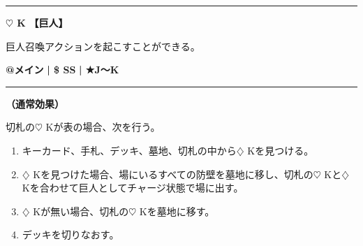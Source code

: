 \documentclass[twocolumn,a5paper,papersize,10pt]{jarticle}
\begin{document}
\vspace{-1zh}

 
 
 
 

\vspace{3mm} %
\hrule height 0.5mm depth 0mm width 66.5mm %
\vspace{1mm} %
{\Large\bf $\heartsuit$ K} {\normalsize\bf【巨人】} %
\vspace{1mm} %

巨人召喚アクションを起こすことができる。

\begin{tcolorbox}[title={\small\bf【Action】巨人召喚}{\scriptsize （召喚）}]

{\scriptsize\bf @メイン }
  {\scriptsize\bf | \$ SS }
  {\scriptsize\bf | ★J〜K}

\vspace{1mm} %
\hrule height 0.1mm depth 0mm width 62mm %
\vspace{1mm} %

{\bf（通常効果）}

切札の{\normalsize $\heartsuit$} Kが表の場合、次を行う。


\vspace{-1zh}%
\begin{enumerate}
\setlength{\leftskip}{-0.3cm}
\setlength{\parskip}{0pt} %

\item キーカード、手札、デッキ、墓地、切札の中から{\normalsize $\diamondsuit$} Kを見つける。

\item {\normalsize $\diamondsuit$} Kを見つけた場合、場にいるすべての防壁を墓地に移し、切札の{\normalsize $\heartsuit$} Kと{\normalsize $\diamondsuit$} Kを合わせて巨人としてチャージ状態で場に出す。

\item {\normalsize $\diamondsuit$} Kが無い場合、切札の{\normalsize $\heartsuit$} Kを墓地に移す。

\item デッキを切りなおす。
\vspace{-1zh}%
\end{enumerate}

\vspace{1mm} %
\end{tcolorbox}

\vspace{-1zh}
\end{document}
